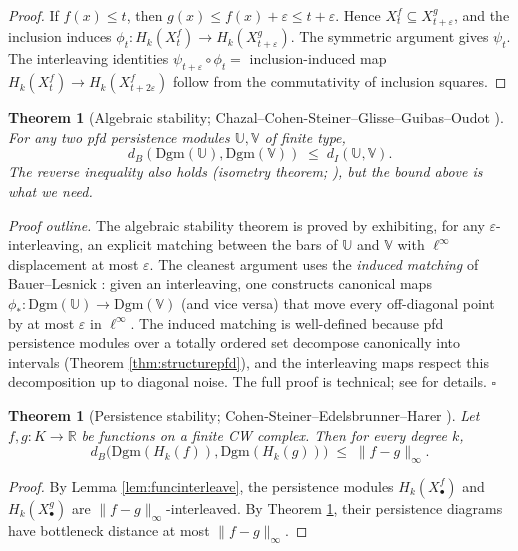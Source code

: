 \documentclass[11pt]{article}
\theoremstyle{persdef}
\newtheorem{theorem}[definition]{Theorem}
\newcommand{\R}{\mathbb{R}}
\newcommand{\X}{X}
\newcommand{\PD}{\mathrm{Dgm}}
\newcommand{\Hk}[1]{H_{#1}}
\begin{document}
\begin{proof}
If $f(x)\leq t$, then $g(x)\leq f(x)+\varepsilon\leq t+\varepsilon$. Hence $\X^f_t\subseteq\X^g_{t+\varepsilon}$, and the inclusion induces $\phi_t:\Hk{k}(\X^f_t)\to\Hk{k}(\X^g_{t+\varepsilon})$. The symmetric argument gives $\psi_t$. The interleaving identities $\psi_{t+\varepsilon}\circ\phi_t = $ inclusion-induced map $\Hk{k}(\X^f_t)\to\Hk{k}(\X^f_{t+2\varepsilon})$ follow from the commutativity of inclusion squares.
\end{proof}

\begin{theorem}[Algebraic stability; Chazal--Cohen-Steiner--Glisse--Guibas--Oudot \cite{CCSGGO09}]\label{thm:algstab}
For any two pfd persistence modules $\mathbb{U},\mathbb{V}$ of finite type,
\[
d_B(\PD(\mathbb{U}),\PD(\mathbb{V})) \;\leq\; d_I(\mathbb{U},\mathbb{V}).
\]
The reverse inequality also holds (isometry theorem; \cite{Les15}), but the bound above is what we need.
\end{theorem}

\noindent\emph{Proof outline.} The algebraic stability theorem is proved by exhibiting, for any $\varepsilon$-interleaving, an explicit matching between the bars of $\mathbb{U}$ and $\mathbb{V}$ with $\ell^\infty$ displacement at most $\varepsilon$. The cleanest argument uses the \emph{induced matching} of Bauer--Lesnick \cite{BL15}: given an interleaving, one constructs canonical maps $\phi_*:\PD(\mathbb{U})\to\PD(\mathbb{V})$ (and vice versa) that move every off-diagonal point by at most $\varepsilon$ in $\ell^\infty$. The induced matching is well-defined because pfd persistence modules over a totally ordered set decompose canonically into intervals (Theorem \ref{thm:structurepfd}), and the interleaving maps respect this decomposition up to diagonal noise. The full proof is technical; see \cite{BL15,CCSGGO09} for details. $\square$

\begin{theorem}[Persistence stability; Cohen-Steiner--Edelsbrunner--Harer \cite{CSEH07}]\label{thm:stab}
Let $f,g:K\to\R$ be functions on a finite CW complex. Then for every degree $k$,
\[
d_B\bigl(\PD(\Hk{k}(f)),\PD(\Hk{k}(g))\bigr) \;\leq\; \|f-g\|_\infty.
\]
\end{theorem}

\begin{proof}
By Lemma \ref{lem:funcinterleave}, the persistence modules $\Hk{k}(\X^f_\bullet)$ and $\Hk{k}(\X^g_\bullet)$ are $\|f-g\|_\infty$-interleaved. By Theorem \ref{thm:algstab}, their persistence diagrams have bottleneck distance at most $\|f-g\|_\infty$.
\end{proof}
\end{document}
